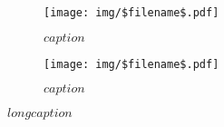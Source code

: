 \begin{figure}
  \centering
  \begin{subfigure}[b]{0.42\textwidth}
    \texttt{[image: img/\$filename\$.pdf]}
    \caption{$caption$}
    \label{fig:$label$}
  \end{subfigure}
  \hspace{1cm} %
  \begin{subfigure}[b]{0.42\textwidth}
    \texttt{[image: img/\$filename\$.pdf]}
    \caption{$caption$}
    \label{fig:$label$}
  \end{subfigure}
  \caption[$short caption$]{$long caption$}
  \label{fig:$label$}
\end{figure}
